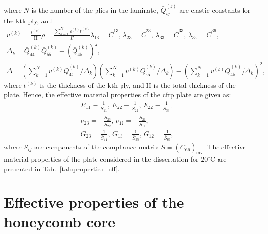 where \(N\) is the number of the plies in the laminate, \(\bar{Q}^{(k)}_{ij}\) are elastic constants for the kth ply, and
\begin{eqnarray}
	 v^{(k)} = \frac{t^{(k)}}{\mathrm{H}}
	 \rho = \frac{\sum_{k=1}^N\rho^{(k)}t^{(k)}}{H}
	\lambda_{13} = \bar{C}^{13},\,	\lambda_{23} = \bar{C}^{23},\, 	\lambda_{33} = \bar{C}^{33},\,	\lambda_{36} = \bar{C}^{36},\\
	\Delta_k = \bar{Q}^{(k)}_{44}\bar{Q}^{(k)}_{55}-\left(\bar{Q}^{(k)}_{45}\right)^2,\\
	\Delta = \left(\sum_{k=1}^Nv^{(k)}\bar{Q}^{(k)}_{44}/\Delta_k\right)\left(\sum_{k=1}^Nv^{(k)}\bar{Q}^{(k)}_{55}/\Delta_k\right)-\left(\sum_{k=1}^Nv^{(k)}\bar{Q}^{(k)}_{45}/\Delta_k\right)^2,
\end{eqnarray}
where \(t^{(k)}\) is the thickness of the kth ply, and H is the total thickness of the plate.
Hence, the effective material properties of the \ac{cfrp} plate are given as:
\begin{eqnarray}
	E_{11} = \frac{1}{\bar{S}_{11}},\,E_{22} = \frac{1}{\bar{S}_{22}},\, E_{22} = \frac{1}{\bar{S}_{33}},\\
	\nu_{23} = -\frac{\bar{S}_{23}}{\bar{S}_{22}},\,\nu_{12} = -\frac{\bar{S}_{21}}{\bar{S}_{11}},\\
	G_{23} = \frac{1}{\bar{S}_{44}},\,G_{13} = \frac{1}{\bar{S}_{55}},\, G_{12} = \frac{1}{\bar{S}_{66}},
\end{eqnarray}
where \(\bar{S}_{ij}\) are components of the compliance matrix \(\bar{S}=\left(\bar{C}_{66}\right)_{\mathrm{inv}}\).
The effective material properties of the plate considered in the dissertation for \(20^{\circ}\)C are presented in Tab.~\ref{tab:properties_eff}.
\section{Effective properties of the honeycomb core}

